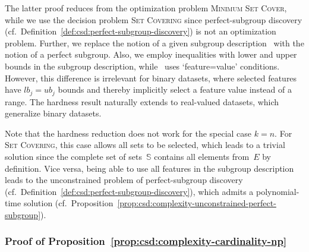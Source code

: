 \documentclass{article}
\theoremstyle{definition}
\begin{document}
The latter proof reduces from the optimization problem \textsc{Minimum Set Cover}, while we use the decision problem \textsc{Set Covering} since perfect-subgroup discovery (cf.~Definition~\ref{def:csd:perfect-subgroup-discovery}) is not an optimization problem.
Further, we replace the notion of a given subgroup description~\cite{boley2009non} with the notion of a perfect subgroup.
Also, we employ inequalities with lower and upper bounds in the subgroup description, while \cite{boley2009non}~uses `feature=value' conditions.
However, this difference is irrelevant for binary datasets, where selected features have $\mathit{lb}_j = \mathit{ub}_j$ bounds and thereby implicitly select a feature value instead of a range.
The hardness result naturally extends to real-valued datasets, which generalize binary datasets.

Note that the hardness reduction does not work for the special case $k=n$.
For \textsc{Set Covering}, this case allows all sets to be selected, which leads to a trivial solution since the complete set of sets~$\mathbb{S}$ contains all elements from~$E$ by definition.
Vice versa, being able to use all features in the subgroup description leads to the unconstrained problem of perfect-subgroup discovery (cf.~Definition~\ref{def:csd:perfect-subgroup-discovery}), which admits a polynomial-time solution (cf.~Proposition~\ref{prop:csd:complexity-unconstrained-perfect-subgroup}).

\subsubsection{Proof of Proposition~\ref{prop:csd:complexity-cardinality-np}}
\label{sec:csd:appendix:proofs:complexity-cardinality-np}
\end{document}
